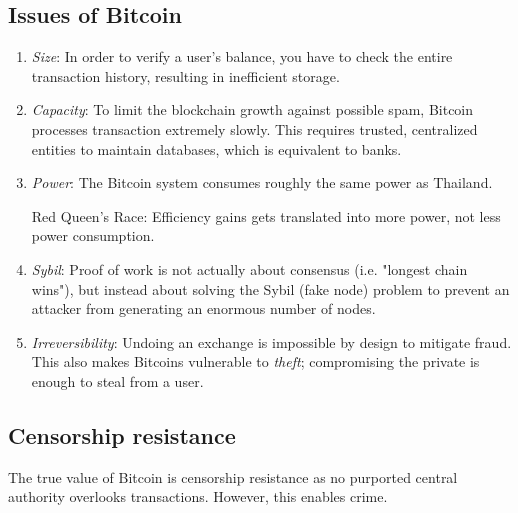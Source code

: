 \subsection{Issues of Bitcoin}
\begin{enumerate}
    \item \emph{Size}: In order to verify a user's balance, you have to check the entire transaction history, resulting in inefficient storage.
    
    \item \emph{Capacity}: To limit the blockchain growth against possible spam, Bitcoin processes transaction extremely slowly. This requires trusted, centralized entities to maintain databases, which is equivalent to banks.
    
    \item \emph{Power}: The Bitcoin system consumes roughly the same power as Thailand.
    
    Red Queen's Race: Efficiency gains gets translated into more power, not less power consumption.
    
    \item \emph{Sybil}: Proof of work is not actually about consensus (i.e. "longest chain wins"), but instead about solving the Sybil (fake node) problem to prevent an attacker from generating an enormous number of nodes.
    
    \item \emph{Irreversibility}: Undoing an exchange is impossible by design to mitigate fraud. This also makes Bitcoins vulnerable to \emph{theft}; compromising the private is enough to steal from a user.
\end{enumerate}

\subsection{Censorship resistance}
The true value of Bitcoin is censorship resistance as no purported central authority overlooks transactions. However, this enables crime.
